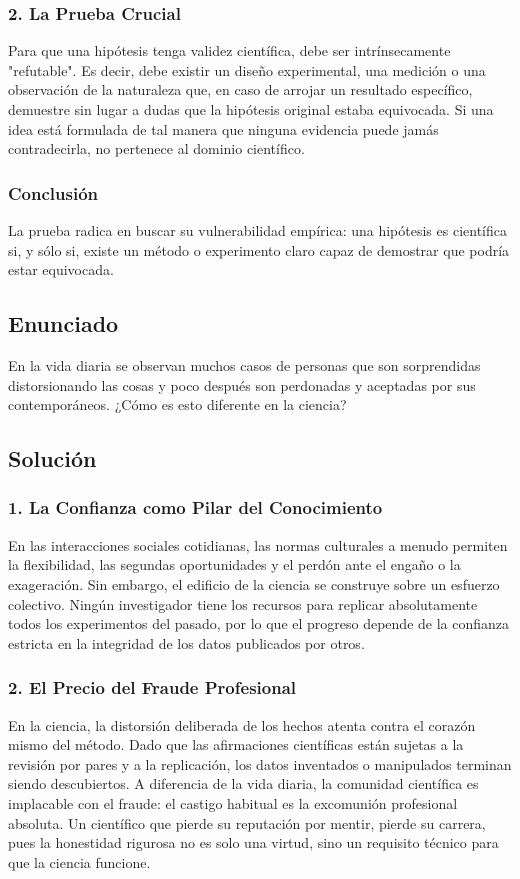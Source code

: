 \documentclass[12pt, a4paper]{article}
\begin{document}
\subsubsection*{2. La Prueba Crucial}
Para que una hipótesis tenga validez científica, debe ser intrínsecamente "refutable". Es decir, debe existir un diseño experimental, una medición o una observación de la naturaleza que, en caso de arrojar un resultado específico, demuestre sin lugar a dudas que la hipótesis original estaba equivocada. Si una idea está formulada de tal manera que ninguna evidencia puede jamás contradecirla, no pertenece al dominio científico.

\subsubsection*{Conclusión}
La prueba radica en buscar su vulnerabilidad empírica: una hipótesis es científica si, y sólo si, existe un método o experimento claro capaz de demostrar que podría estar equivocada.

\newpage

\subsection*{Enunciado}
En la vida diaria se observan muchos casos de personas que son sorprendidas distorsionando las cosas y poco después son perdonadas y aceptadas por sus contemporáneos. ¿Cómo es esto diferente en la ciencia?

\subsection*{Solución}

\subsubsection*{1. La Confianza como Pilar del Conocimiento}
En las interacciones sociales cotidianas, las normas culturales a menudo permiten la flexibilidad, las segundas oportunidades y el perdón ante el engaño o la exageración. Sin embargo, el edificio de la ciencia se construye sobre un esfuerzo colectivo. Ningún investigador tiene los recursos para replicar absolutamente todos los experimentos del pasado, por lo que el progreso depende de la confianza estricta en la integridad de los datos publicados por otros.

\subsubsection*{2. El Precio del Fraude Profesional}
En la ciencia, la distorsión deliberada de los hechos atenta contra el corazón mismo del método. Dado que las afirmaciones científicas están sujetas a la revisión por pares y a la replicación, los datos inventados o manipulados terminan siendo descubiertos. A diferencia de la vida diaria, la comunidad científica es implacable con el fraude: el castigo habitual es la excomunión profesional absoluta. Un científico que pierde su reputación por mentir, pierde su carrera, pues la honestidad rigurosa no es solo una virtud, sino un requisito técnico para que la ciencia funcione.
\end{document}
